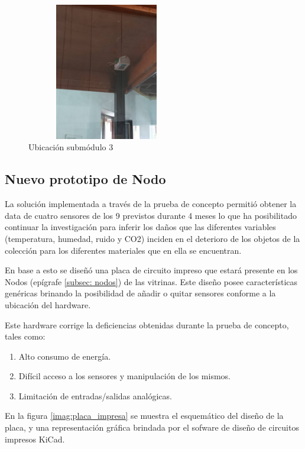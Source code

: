    \begin{figure}[H]
        \centering
        \includegraphics[width=7cm, height=6cm]{imagenes/submodulo 3.jpg}
        \caption{Ubicación submódulo 3}
        \label{imag:ubicacion_submodulo3}
    \end{figure}

    \subsection{Nuevo prototipo de Nodo} \label{subsec:nuevo_prototipo_nodo}

    La solución implementada a través de la prueba de concepto permitió obtener la data de cuatro sensores de los 9 previstos durante 4 meses lo que ha posibilitado continuar la investigación para inferir
    los daños que las diferentes variables (temperatura, humedad, ruido y CO2) inciden en el deterioro de los objetos de la colección para los diferentes materiales que en ella se encuentran.

    En base a esto se diseñó una placa de circuito impreso que estará presente en los Nodos (epígrafe \ref{subsec: nodos}) de las vitrinas.
    Este diseño posee características genéricas brinando la posibilidad de añadir o quitar sensores conforme a la ubicación del hardware.

    \newpage

    Este hardware corrige la deficiencias obtenidas durante la prueba de concepto, tales como:
      \begin{enumerate}
        \item Alto consumo de energía.
        \item Difícil acceso a los sensores y manipulación de los mismos.
        \item Limitación de entradas/salidas analógicas.
      \end{enumerate}

    En la figura \ref{imag:placa_impresa} se muestra el esquemático del diseño de la placa, y una representación gráfica brindada por el sofware de diseño de circuitos impresos KiCad.

